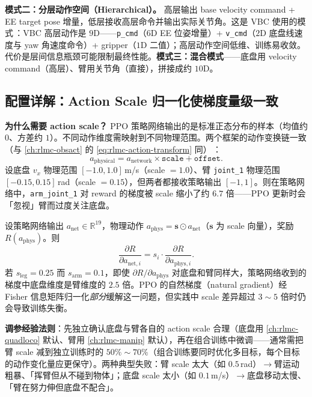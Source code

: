 \textbf{模式二：分层动作空间（Hierarchical）。} 高层输出 base velocity command + EE target pose 增量，低层接收高层命令并输出实际关节角。这是 VBC 使用的模式\,\cite{liu2024vbc}：VBC 高层动作是 $9$D——\verb|p_cmd|（$6$D EE 位姿增量）+ \verb|v_cmd|（$2$D 底盘线速度与 yaw 角速度命令）+ gripper（$1$D 二值）；高层动作空间低维、训练易收敛。代价是层间信息瓶颈可能限制最终性能。\textbf{模式三：混合模式}——底盘用 velocity command（高层）、臂用关节角（直接），拼接成约 $10$D。

\subsection{配置详解：Action Scale 归一化使梯度量级一致}
\label{sec:rlmc-lm-action-scale}

\textbf{为什么需要 action scale？} PPO 策略网络输出的是标准正态分布的样本（均值约 $0$、方差约 $1$）。不同动作维度需映射到不同物理范围。两个框架的动作变换链一致（与 \cref{ch:rlmc-obsact} 的 \cref{eq:rlmc-action-transform} 同）\,\cite{isaaclab2024,mjlab2026}：
\begin{equation}
a_{\text{physical}} = a_{\text{network}}\times\texttt{scale} + \texttt{offset}.
\label{eq:rlmc-lm-action}
\end{equation}
设底盘 $v_x$ 物理范围 $[-1.0,1.0]\,$m/s（scale $=1.0$）、臂 \verb|joint_1| 物理范围 $[-0.15,0.15]\,$rad（scale $=0.15$），但两者都接收策略输出 $[-1,1]$。则在策略网络中，\verb|arm_joint_1| 对 reward 的梯度被 scale 缩小了约 $6.7$ 倍——PPO 更新时会「忽视」臂而过度关注底盘。

\begin{derivation}\label{der:rlmc-lm-grad}
设策略网络输出 $a_{\text{net}}\in\mathbb R^{19}$，物理动作 $a_{\text{phys}}=\mathbf s\odot a_{\text{net}}$（$\mathbf s$ 为 scale 向量），奖励 $R(a_{\text{phys}})$。则
\begin{equation}
\frac{\partial R}{\partial a_{\text{net},i}} = s_i\cdot\frac{\partial R}{\partial a_{\text{phys},i}}.
\label{eq:rlmc-lm-gradchain}
\end{equation}
若 $s_{\text{leg}}=0.25$ 而 $s_{\text{arm}}=0.1$，即使 $\partial R/\partial a_{\text{phys}}$ 对底盘和臂同样大，策略网络收到的梯度中底盘维度是臂维度的 $2.5$ 倍。PPO 的自然梯度（natural gradient）经 Fisher 信息矩阵归一化\emph{部分}缓解这一问题，但实践中 scale 差异超过 $3\!\sim\!5$ 倍时仍会导致训练失衡。
\end{derivation}

\textbf{调参经验法则}：先独立确认底盘与臂各自的 action scale 合理（底盘用 \cref{ch:rlmc-quadloco} 默认、臂用 \cref{ch:rlmc-manip} 默认），再在组合训练中微调——通常需把臂 scale 减到独立训练时的 $50\%\!\sim\!70\%$（组合训练要同时优化多目标，每个目标的动作变化量应更保守）。两种典型失败：臂 scale 太大（如 $0.5\,$rad）$\to$臂运动粗暴、「挥臂但从不碰到物体」；底盘 scale 太小（如 $0.1\,$m/s）$\to$底盘移动太慢、「臂在努力伸但底盘不配合」。

